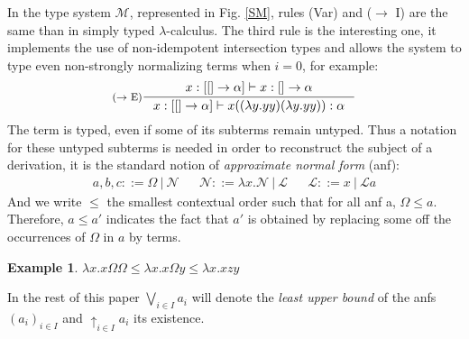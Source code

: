 \documentclass{article}
\newtheorem*{Ex*}{Example}
\def\sysm{system $\mathcal{M}$}
\begin{document}
In the type \sysm, represented in Fig. \ref{SM}, rules (Var) and ($\rightarrow$ I) are the same than in simply typed $\lambda$-calculus. The third rule is the interesting one, it implements the use of non-idempotent intersection types and allows the system to type even non-strongly normalizing terms when $i = 0$, for example:
\begin{displaymath}
    \inference[($\rightarrow$ E)]{x:[[] \rightarrow \alpha] \vdash x : [] \rightarrow \alpha}{x : [[] \rightarrow \alpha] \vdash x((\lambda y.yy)(\lambda y.yy)) : \alpha}
\end{displaymath}
The term is typed, even if some of its subterms remain untyped. Thus a notation for these untyped subterms is needed in order to reconstruct the subject of a derivation, it is the standard notion of \emph{approximate normal form} (anf):
\begin{align*}
    a,b,c ::= \Omega\ |\ \mathcal{N} 
    && \mathcal{N} ::= \lambda x.\mathcal{N}\ |\ \mathcal{L}
    && \mathcal{L} ::= x\ |\ \mathcal{L}a
\end{align*}
And we write $\leq$ the smallest contextual order such that for all anf a, $\Omega \leq a$. Therefore, $a \leq a'$ indicates the fact that $a'$ is obtained by replacing some off the occurrences of $\Omega$ in $a$ by terms.

\begin{Ex*}
    $\lambda x.x\Omega\Omega \leq \lambda x.x\Omega y \leq \lambda x.xzy$
\end{Ex*}
In the rest of this paper $\bigvee_{i\in I}a_i$ will denote the \emph{least upper bound} of the anfs $(a_i)_{i\in I}$ and $\uparrow_{i \in I}a_i$ its existence.
\end{document}
